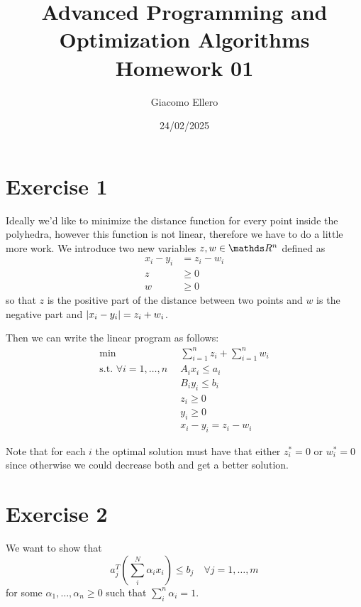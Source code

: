 \documentclass[12pt]{extarticle}
\title{Advanced Programming and Optimization Algorithms \\ Homework 01}
\author{Giacomo Ellero}
\date{24/02/2025}
\numberwithin{equation}{section}
\begin{document}
\maketitle

\section*{Exercise 1}

Ideally we'd like to minimize the distance function for every point inside the polyhedra,
however this function is not linear, therefore we have to do a little more work.
We introduce two new variables $z, w \in \R^n$ defined as
\begin{align}
	x_i - y_i & = z_i - w_i \\
	z         & \geq 0      \\
	w         & \geq 0
\end{align}
so that $z$ is the positive part of the distance between two points and $w$ is the negative part
and $\abs{x_i - y_i} = z_i + w_i$.

Then we can write the linear program as follows:
\begin{align}
	\min                                          & \sum_{i = 1}^n z_i + \sum_{i = 1}^n w_i \\
	\text{s.t. } \forall i = 1, \dots, n \enspace & A_i x_i \leq a_i                        \\
	                                              & B_i y_i \leq b_i                        \\
	                                              & z_i \geq 0                              \\
	                                              & y_i \geq 0                              \\
	                                              & x_i - y_i = z_i - w_i
\end{align}

Note that for each $i$ the optimal solution must have that either $z_i^* = 0$ or $w_i^* = 0$
since otherwise we could decrease both and get a better solution.

\section*{Exercise 2}

We want to show that
\begin{equation}
	a^T_j \left(\sum_i^N \alpha_i x_i\right) \leq b_j \quad \forall j = 1, \dots, m
\end{equation}
for some $\alpha_1, \dots, \alpha_n \geq 0$ such that $\sum_i^n \alpha_i = 1$.
\end{document}
